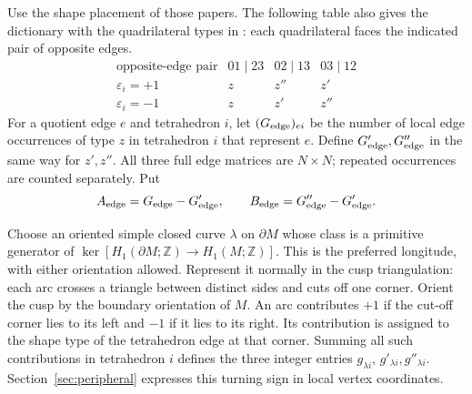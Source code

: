 \documentclass[11pt]{article}
\theoremstyle{definition}\newtheorem{definition}[theorem]{Definition}
\theoremstyle{remark}\newtheorem{remark}[theorem]{Remark}
\newcommand{\Z}{\mathbb Z}
\newcommand{\eps}{\varepsilon}
\begin{document}
Use the shape placement of those papers. The following table also gives
the dictionary with the quadrilateral types in \cite[Section 3.1]{GHHHR}:
each quadrilateral faces the indicated pair of opposite edges.
\[
\begin{array}{c|ccc}
\text{opposite-edge pair}&01\mid23&02\mid13&03\mid12\\\hline
\eps_i=+1&z&z''&z'\\
\eps_i=-1&z&z'&z''
\end{array}
\]
For a quotient edge $e$ and tetrahedron $i$, let
$(G_{\rm edge})_{ei}$ be the number of local edge occurrences of type
$z$ in tetrahedron $i$ that represent $e$. Define
$G'_{\rm edge},G''_{\rm edge}$ in the same way for $z',z''$.
All three full edge matrices are $N\times N$; repeated occurrences
are counted separately. Put
\[
A_{\rm edge}=G_{\rm edge}-G'_{\rm edge},\qquad
B_{\rm edge}=G''_{\rm edge}-G'_{\rm edge}.
\]

Choose an oriented simple closed curve $\lambda$ on $\partial M$
whose class is a primitive generator of
$\ker[H_1(\partial M;\Z)\to H_1(M;\Z)]$.
This is the preferred longitude, with either orientation allowed.
Represent it normally in the cusp triangulation: each arc crosses a
triangle between distinct sides and cuts off one corner. Orient the
cusp by the boundary orientation of $M$. An arc contributes $+1$ if
the cut-off corner lies to its left and $-1$ if it lies to its right.
Its contribution is assigned to the shape type of the tetrahedron
edge at that corner. Summing all such contributions in tetrahedron
$i$ defines the three integer entries $g_{\lambda i}$,
$g'_{\lambda i},g''_{\lambda i}$. Section~\ref{sec:peripheral}
expresses this turning sign in local vertex coordinates.
\end{document}
